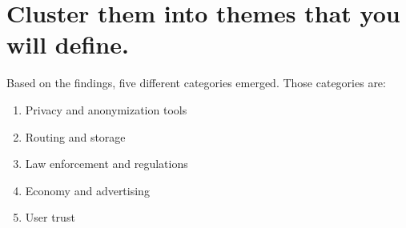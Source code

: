 \vspace{1cm}
\section{Cluster them into themes that you will define.}
\label{section_2}
Based on the findings, five different categories emerged. Those categories are:
\begin{enumerate}
\item
Privacy and anonymization tools
\item
Routing and storage
\item
Law enforcement and regulations
\item
Economy and advertising
\item
User trust
\end{enumerate}

\newpage
